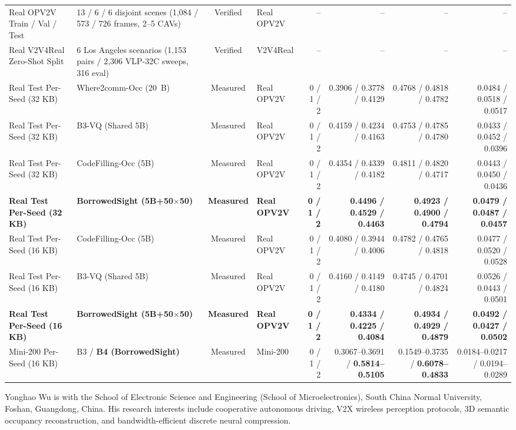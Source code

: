 \documentclass[journal]{IEEEtran}
\begin{document}
\begin{table}[!tbp]
{\begin{tabular}{llclrrrr}
\midrule
Real OPV2V Train / Val / Test & 13 / 6 / 6 disjoint scenes (1,084 / 573 / 726 frames, 2--5 CAVs) & Verified & Real OPV2V & -- & -- & -- & -- \\
Real V2V4Real Zero-Shot Split & 6 Los Angeles scenarios (1,153 pairs / 2,306 VLP-32C sweeps, 316 eval) & Verified & V2V4Real & -- & -- & -- & -- \\
\midrule
Real Test Per-Seed (32 KB) & Where2comm-Occ (20~B) & Measured & Real OPV2V & 0 / 1 / 2 & 0.3906 / 0.3778 / 0.4129 & 0.4768 / 0.4818 / 0.4782 & 0.0484 / 0.0518 / 0.0517 \\
Real Test Per-Seed (32 KB) & B3-VQ (Shared 5B) & Measured & Real OPV2V & 0 / 1 / 2 & 0.4159 / 0.4234 / 0.4163 & 0.4753 / 0.4785 / 0.4780 & 0.0433 / 0.0452 / 0.0396 \\
Real Test Per-Seed (32 KB) & CodeFilling-Occ (5B) & Measured & Real OPV2V & 0 / 1 / 2 & 0.4354 / 0.4339 / 0.4182 & 0.4811 / 0.4820 / 0.4717 & 0.0443 / 0.0450 / 0.0436 \\
\rowcolor{oursrow}
\textbf{Real Test Per-Seed (32 KB)} & \textbf{BorrowedSight (5B+50$\times$50)} & \textbf{Measured} & \textbf{Real OPV2V} & \textbf{0 / 1 / 2} & \textbf{0.4496 / 0.4529 / 0.4463} & \textbf{0.4923 / 0.4900 / 0.4794} & \textbf{0.0479 / 0.0487 / 0.0457} \\
Real Test Per-Seed (16 KB) & CodeFilling-Occ (5B) & Measured & Real OPV2V & 0 / 1 / 2 & 0.4080 / 0.3944 / 0.4006 & 0.4782 / 0.4765 / 0.4818 & 0.0477 / 0.0520 / 0.0528 \\
Real Test Per-Seed (16 KB) & B3-VQ (Shared 5B) & Measured & Real OPV2V & 0 / 1 / 2 & 0.4160 / 0.4149 / 0.4180 & 0.4745 / 0.4701 / 0.4824 & 0.0526 / 0.0443 / 0.0501 \\
\rowcolor{oursrow}
\textbf{Real Test Per-Seed (16 KB)} & \textbf{BorrowedSight (5B+50$\times$50)} & \textbf{Measured} & \textbf{Real OPV2V} & \textbf{0 / 1 / 2} & \textbf{0.4334 / 0.4225 / 0.4084} & \textbf{0.4934 / 0.4929 / 0.4879} & \textbf{0.0492 / 0.0427 / 0.0502} \\
Mini-200 Per-Seed (16 KB) & B3 / \textbf{B4 (BorrowedSight)} & Measured & Mini-200 & 0 / 1 / 2 & 0.3067--0.3691 / \textbf{0.5814--0.5105} & 0.1549--0.3735 / \textbf{0.6078--0.4833} & 0.0184--0.0217 / 0.0194--0.0289 \\
\bottomrule
\end{tabular}}
\end{table}




\begin{IEEEbiographynophoto}{Yonghao Wu}
is with the School of Electronic Science and Engineering (School of Microelectronics), South China Normal University, Foshan, Guangdong, China. His research interests include cooperative autonomous driving, V2X wireless perception protocols, 3D semantic occupancy reconstruction, and bandwidth-efficient discrete neural compression.
\end{IEEEbiographynophoto}
\end{document}
